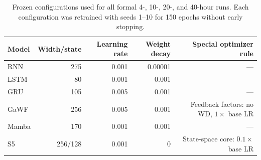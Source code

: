 \begin{table}[t]
\centering
\caption{Baseline optimizer search after fixing the parameter-matched widths. The selected values use the same seed-42 validation protocol as the GaWF search.}
\label{tab:baseline-search}
\end{table}

\begin{table}[t]
\centering
\caption{Frozen configurations used for all formal 4-, 10-, 20-, and 40-hour runs. Each configuration was retrained with seeds 1--10 for 150 epochs without early stopping.}
\label{tab:formal-config}
\begin{tabular}{lrrrr}
\toprule
Model & Width/state & Learning rate & Weight decay & Special optimizer rule \\
\midrule
RNN & 275 & 0.001 & 0.00001 & --- \\
LSTM & 80 & 0.001 & 0.001 & --- \\
GRU & 105 & 0.005 & 0.001 & --- \\
GaWF & 256 & 0.005 & 0.001 & Feedback factors: no WD, \(1\times\) base LR \\
Mamba & 170 & 0.001 & 0.001 & --- \\
S5 & 256/128 & 0.001 & 0 & State-space core: \(0.1\times\) base LR \\
\bottomrule
\end{tabular}
\end{table}

